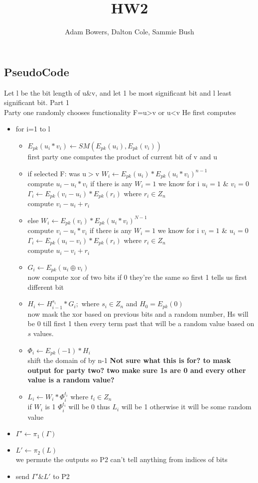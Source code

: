 \documentclass[10pt]{article} %
\title{HW2}
\author{Adam Bowers, Dalton Cole, Sammie Bush}
\begin{document}
\maketitle

\subsection*{\textbf{PseudoCode}}
Let l be the bit length of u\&v, and let 1 be most significant bit and l least significant bit.
Part 1\\
Party one randomly chooses functionality F=u>v or u<v
He first computes 
\begin{itemize}
	\item for i=1 to l 
		\begin{itemize}
			\item $E_{pk} (u_i * v_i ) \gets SM(E_{pk} (u_i) , E_{pk}(v_i))$
			\\ first party one computes the product of current bit of v and u
			\item if selected F: was u$>$v
			 \subitem $W_i \gets E_{pk} (u_i) * E_{pk} (u_i * v_i)^{n-1}$
			 \\compute $u_i - u_i*v_i $ if there is any $W_i=1$ we know for i $u_i=1$ \& $v_i=0$
			 \subitem $\Gamma_i \gets E_{pk}(v_i - u_i) * E_{pk}(r_i)$ where $r_i \in Z_n$
			 \\compute $v_i - u_i +r_i$
			\item else
			\subitem $W_i \gets E_{pk} (v_i) * E_{pk} (u_i * v_i)^{N-1}$
			\\compute $v_i - u_i*v_i $  if there is any $W_i=1$ we know for i $v_i=1$ \& $u_i=0$
			\subitem $\Gamma_i \gets E_{pk}(u_i - v_i) * E_{pk}(r_i)$ where $r_i \in Z_n$
			\\compute $u_i - v_i +r_i$
			\item $G_i \gets E_{pk}(u_i \oplus v_i)$
			\\now compute xor of two bits if 0 they're the same so first 1 tells us first different bit
			\item $H_i \gets H_{i-1}^{s_i} * G_i ;$ where $s_i \in Z_n$ and $H_0 = E_{pk}(0)$
			\\now mask the xor based on previous bits and a random number, Hs will be 0 till first 1 then every term past that will be a random value based on $s$ values.
			\item $\Phi_i \gets E_{pk}(-1) * H_i$
			\\shift the domain of by n-1
			 \textbf{Not sure what this is for? to mask output for party two? two make sure 1s are 0 and every other value is a random value?}
			\item $L_i \gets W_i * \Phi_i^{t_i}$ where $t_i \in Z_n$
			\\ if $W_i$ is 1 $\Phi_i^{t_i}$ will be 0 thus $L_i$ will be 1 otherwise it will be some random value 
		\end{itemize}
	\item  $\Gamma' \gets \pi_1(\Gamma)$
	\item $L' \gets \pi_2(L)$
	\\we permute the outputs so P2 can't tell anything from indices of bits
	\item send $\Gamma' \& L'$ to P2
\end{itemize}
\end{document}
